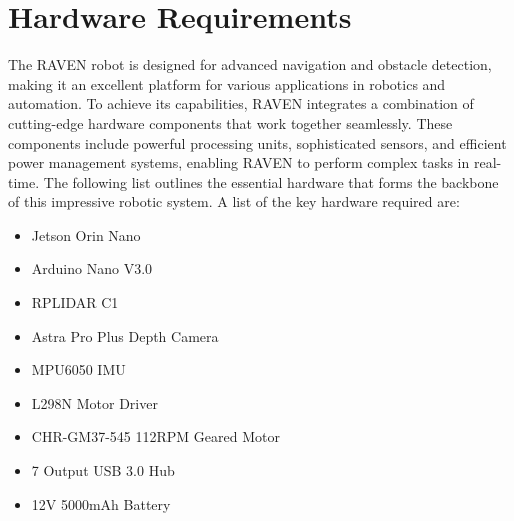 \section{\fontsize{14}{16} Hardware Requirements}
{
	\fontsize{12}{14}
	The RAVEN robot is designed for advanced navigation and obstacle detection, making it an excellent platform for various applications in robotics and automation. To achieve its capabilities, RAVEN integrates a combination of cutting-edge hardware components that work together seamlessly. These components include powerful processing units, sophisticated sensors, and efficient power management systems, enabling RAVEN to perform complex tasks in real-time. The following list outlines the essential hardware that forms the backbone of this impressive robotic system. A list of the key hardware required are:
	
	\begin{itemize}
		\item Jetson Orin Nano
		
		\item Arduino Nano V3.0
				
		\item RPLIDAR C1
		
		\item Astra Pro Plus Depth Camera
		
		\item MPU6050 IMU
		
		\item L298N Motor Driver
		
		\item CHR-GM37-545 112RPM Geared Motor
		
		\item 7 Output USB 3.0 Hub
		
		\item 12V 5000mAh Battery
		
	\end{itemize}
	
}

